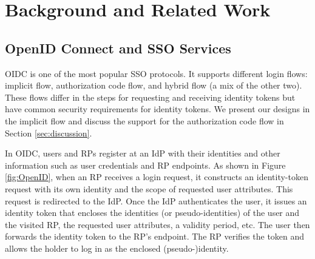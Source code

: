 \section{Background and Related Work}
\label{sec:background}


\subsection{OpenID Connect and SSO Services}
\label{subsec:OIDC}
OIDC is one of the most popular SSO protocols. It supports different login flows: implicit flow, authorization code flow, and hybrid flow (a mix of the other two). These flows differ in the steps for requesting and receiving identity tokens but have common security requirements for identity tokens. We present our designs in the implicit flow and discuss the support for the authorization code flow in Section \ref{sec:discussion}.

In OIDC, users and RPs register at an IdP with their identities
and other information such as user credentials %
and RP endpoints. %
As shown in Figure \ref{fig:OpenID}, when an RP receives a login request, it constructs an identity-token request with its own identity and the scope of requested user attributes.
This request is redirected to the IdP. Once the IdP authenticates the user, it issues an identity token that encloses the identities (or pseudo-identities) of the user and the visited RP, the requested user attributes, a validity period, etc. The user then forwards the identity token to the RP's endpoint. The RP verifies the token and allows the holder to log in as the enclosed (pseudo-)identity.

